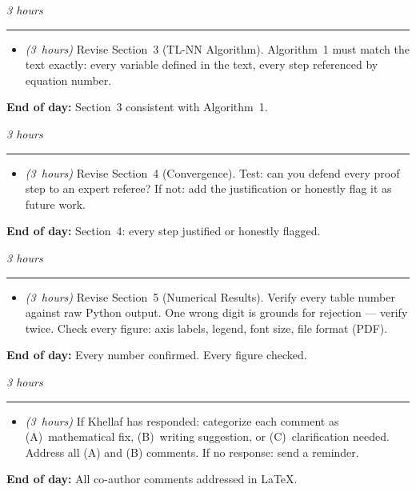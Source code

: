 \documentclass[12pt,a4paper]{article}
\newcommand{\hrs}[1]{\textit{\color{darkgray}(#1~hours)}}
\newcommand{\dayheading}[2]{%
  \vspace{0.3em}
  \noindent{\bfseries\color{darkblue}Day~#1}%
  \hfill{\small\color{darkgray}\textit{#2}}%
  \\[-0.4em]{\color{midgray}\rule{\linewidth}{0.4pt}}%
  \vspace{0.1em}
}
\begin{document}
\begin{tcolorbox}[daystyle]
\dayheading{31}{3 hours}
\begin{itemize}[leftmargin=1.8em,itemsep=3pt]
  \item[\color{midblue}$\bullet$]
    \hrs{3} Revise Section~3 (TL-NN Algorithm). Algorithm~1
    must match the text exactly: every variable defined in
    the text, every step referenced by equation number.
\end{itemize}
\noindent\textbf{End of day:}
Section~3 consistent with Algorithm~1.
\end{tcolorbox}

\begin{tcolorbox}[daystyle]
\dayheading{32}{3 hours}
\begin{itemize}[leftmargin=1.8em,itemsep=3pt]
  \item[\color{midblue}$\bullet$]
    \hrs{3} Revise Section~4 (Convergence). Test: can you
    defend every proof step to an expert referee? If not:
    add the justification or honestly flag it as future work.
\end{itemize}
\noindent\textbf{End of day:}
Section~4: every step justified or honestly flagged.
\end{tcolorbox}

\begin{tcolorbox}[daystyle]
\dayheading{33}{3 hours}
\begin{itemize}[leftmargin=1.8em,itemsep=3pt]
  \item[\color{midblue}$\bullet$]
    \hrs{3} Revise Section~5 (Numerical Results). Verify
    every table number against raw Python output.
    One wrong digit is grounds for rejection --- verify
    twice. Check every figure: axis labels, legend, font
    size, file format (PDF).
\end{itemize}
\noindent\textbf{End of day:}
Every number confirmed. Every figure checked.
\end{tcolorbox}

\begin{tcolorbox}[daystyle]
\dayheading{34}{3 hours}
\begin{itemize}[leftmargin=1.8em,itemsep=3pt]
  \item[\color{midblue}$\bullet$]
    \hrs{3} If Khellaf has responded: categorize each
    comment as (A)~mathematical fix, (B)~writing
    suggestion, or (C)~clarification needed. Address all
    (A) and (B) comments. If no response: send a reminder.
\end{itemize}
\noindent\textbf{End of day:}
All co-author comments addressed in \LaTeX.
\end{tcolorbox}
\end{document}
